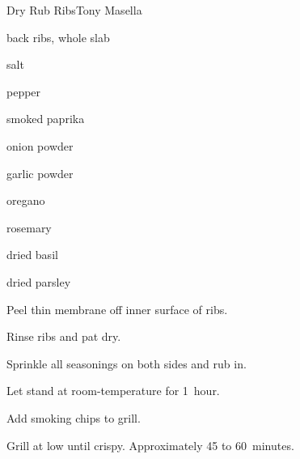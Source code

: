 \begin{recipe}{Dry Rub Ribs}{Tony Masella}{}

\begin{ingredients}
\item back  ribs, whole slab
\item salt
\item pepper
\item smoked paprika
\item onion powder
\item garlic powder
\item oregano
\item rosemary
\item dried basil
\item dried parsley
\end{ingredients}

\begin{directions}
\item Peel thin membrane off inner surface of ribs.
\item Rinse ribs and pat dry.
\item Sprinkle all seasonings on both sides and rub in.
\item Let stand at room-temperature for 1~hour.
\item Add smoking chips to grill.
\item Grill at low until crispy. Approximately 45 to 60~minutes.
\end{directions}

\hint{}
\end{recipe}
